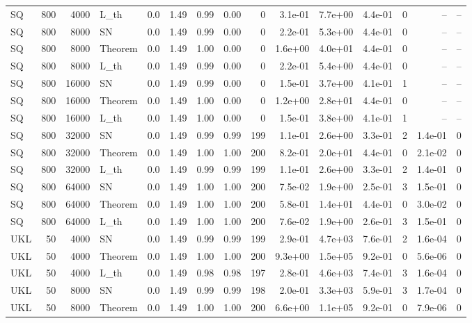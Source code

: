 \begin{tabular}{lrrlrrrrrrrrrrr}
SQ & 800 & 4000 & L\_th & 0.0 & 1.49 & 0.99 & 0.00 & 0 & 3.1e-01 & 7.7e+00 & 4.4e-01 & 0 & -- & -- \\
SQ & 800 & 8000 & SN & 0.0 & 1.49 & 0.99 & 0.00 & 0 & 2.2e-01 & 5.3e+00 & 4.4e-01 & 0 & -- & -- \\
SQ & 800 & 8000 & Theorem & 0.0 & 1.49 & 1.00 & 0.00 & 0 & 1.6e+00 & 4.0e+01 & 4.4e-01 & 0 & -- & -- \\
SQ & 800 & 8000 & L\_th & 0.0 & 1.49 & 0.99 & 0.00 & 0 & 2.2e-01 & 5.4e+00 & 4.4e-01 & 0 & -- & -- \\
SQ & 800 & 16000 & SN & 0.0 & 1.49 & 0.99 & 0.00 & 0 & 1.5e-01 & 3.7e+00 & 4.1e-01 & 1 & -- & -- \\
SQ & 800 & 16000 & Theorem & 0.0 & 1.49 & 1.00 & 0.00 & 0 & 1.2e+00 & 2.8e+01 & 4.4e-01 & 0 & -- & -- \\
SQ & 800 & 16000 & L\_th & 0.0 & 1.49 & 1.00 & 0.00 & 0 & 1.5e-01 & 3.8e+00 & 4.1e-01 & 1 & -- & -- \\
SQ & 800 & 32000 & SN & 0.0 & 1.49 & 0.99 & 0.99 & 199 & 1.1e-01 & 2.6e+00 & 3.3e-01 & 2 & 1.4e-01 & 0 \\
SQ & 800 & 32000 & Theorem & 0.0 & 1.49 & 1.00 & 1.00 & 200 & 8.2e-01 & 2.0e+01 & 4.4e-01 & 0 & 2.1e-02 & 0 \\
SQ & 800 & 32000 & L\_th & 0.0 & 1.49 & 0.99 & 0.99 & 199 & 1.1e-01 & 2.6e+00 & 3.3e-01 & 2 & 1.4e-01 & 0 \\
SQ & 800 & 64000 & SN & 0.0 & 1.49 & 1.00 & 1.00 & 200 & 7.5e-02 & 1.9e+00 & 2.5e-01 & 3 & 1.5e-01 & 0 \\
SQ & 800 & 64000 & Theorem & 0.0 & 1.49 & 1.00 & 1.00 & 200 & 5.8e-01 & 1.4e+01 & 4.4e-01 & 0 & 3.0e-02 & 0 \\
SQ & 800 & 64000 & L\_th & 0.0 & 1.49 & 1.00 & 1.00 & 200 & 7.6e-02 & 1.9e+00 & 2.6e-01 & 3 & 1.5e-01 & 0 \\
UKL & 50 & 4000 & SN & 0.0 & 1.49 & 0.99 & 0.99 & 199 & 2.9e-01 & 4.7e+03 & 7.6e-01 & 2 & 1.6e-04 & 0 \\
UKL & 50 & 4000 & Theorem & 0.0 & 1.49 & 1.00 & 1.00 & 200 & 9.3e+00 & 1.5e+05 & 9.2e-01 & 0 & 5.6e-06 & 0 \\
UKL & 50 & 4000 & L\_th & 0.0 & 1.49 & 0.98 & 0.98 & 197 & 2.8e-01 & 4.6e+03 & 7.4e-01 & 3 & 1.6e-04 & 0 \\
UKL & 50 & 8000 & SN & 0.0 & 1.49 & 0.99 & 0.99 & 198 & 2.0e-01 & 3.3e+03 & 5.9e-01 & 3 & 1.7e-04 & 0 \\
UKL & 50 & 8000 & Theorem & 0.0 & 1.49 & 1.00 & 1.00 & 200 & 6.6e+00 & 1.1e+05 & 9.2e-01 & 0 & 7.9e-06 & 0 \\

\end{tabular}

